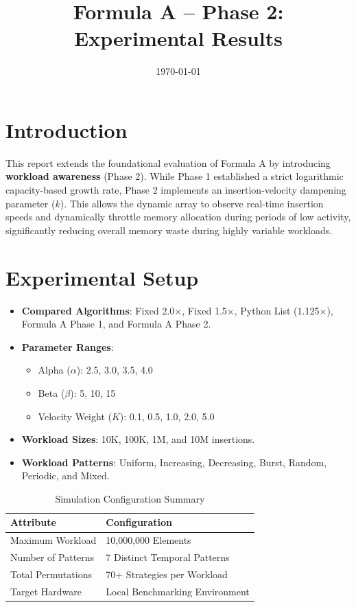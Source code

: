 \documentclass[11pt, a4paper]{article}
\title{Formula A -- Phase 2: Experimental Results}
\author{}
\date{\today}
\begin{document}
\maketitle
\tableofcontents
\listoffigures
\listoftables
\newpage

\section{Introduction}
This report extends the foundational evaluation of Formula A by introducing \textbf{workload awareness} (Phase 2). While Phase 1 established a strict logarithmic capacity-based growth rate, Phase 2 implements an insertion-velocity dampening parameter ($k$). This allows the dynamic array to observe real-time insertion speeds and dynamically throttle memory allocation during periods of low activity, significantly reducing overall memory waste during highly variable workloads.

\section{Experimental Setup}
\begin{itemize}
    \item \textbf{Compared Algorithms}: Fixed 2.0$\times$, Fixed 1.5$\times$, Python List (1.125$\times$), Formula A Phase 1, and Formula A Phase 2.
    \item \textbf{Parameter Ranges}: 
        \begin{itemize}
            \item Alpha ($\alpha$): 2.5, 3.0, 3.5, 4.0
            \item Beta ($\beta$): 5, 10, 15
            \item Velocity Weight ($K$): 0.1, 0.5, 1.0, 2.0, 5.0
        \end{itemize}
    \item \textbf{Workload Sizes}: 10K, 100K, 1M, and 10M insertions.
    \item \textbf{Workload Patterns}: Uniform, Increasing, Decreasing, Burst, Random, Periodic, and Mixed.
\end{itemize}

\begin{table}[H]
\centering
\caption{Simulation Configuration Summary}
\begin{tabular}{@{}ll@{}}
\toprule
\textbf{Attribute} & \textbf{Configuration} \\
\midrule
Maximum Workload & 10,000,000 Elements \\
Number of Patterns & 7 Distinct Temporal Patterns \\
Total Permutations & 70+ Strategies per Workload \\
Target Hardware & Local Benchmarking Environment \\
\bottomrule
\end{tabular}
\end{table}
\end{document}
